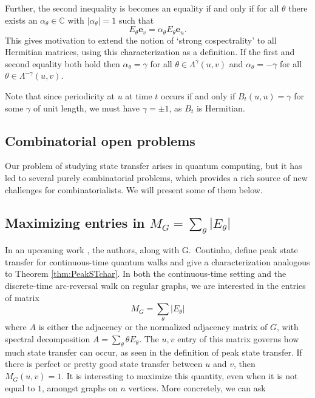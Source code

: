\documentclass{article}
\numberwithin{equation}{section}
\newcommand\cx{{\mathbb C}}%
\newcommand\Ze{{\mathbf e}}
\begin{document}
Further, the second inequality is becomes an equality if and only if for all $\theta$ there exists an $\alpha_\theta \in \cx$ with $|\alpha_\theta| = 1$ such that
\[
E_\theta\Ze_v = \alpha_\theta E_\theta\Ze_u.
\]
This gives motivation to extend the notion of `strong cospectrality' to all Hermitian matrices, using this characterization as a definition. If the first and second equality both hold then $\alpha_\theta = \gamma$ for all $\theta \in \Lambda^\gamma(u,v)$ and $\alpha_\theta = -\gamma$ for all $\theta \in \Lambda^{-\gamma}(u,v)$.


Note that since periodicity at $u$ at time $t$ occurs if and only if $B_t(u,u) = \gamma$ for some $\gamma$ of unit length, we must have $\gamma = \pm 1$, as $B_t$ is Hermitian.

\subsection{Combinatorial open problems}


Our problem of studying state transfer arises in quantum computing, but it has led to several purely  combinatorial problems, which provides a rich source of new challenges for combinatorialists. We will present some of them below. 

\subsection*{Maximizing entries in \texorpdfstring{$ M_G = \sum_{\theta} |E_{\theta}| $}{M}}


In an upcoming work \cite{CouGuoSch2025}, the authors, along with G.~Coutinho, define peak state transfer for continuous-time quantum walks and give a characterization analogous to Theorem \ref{thm:PeakSTchar}. In both the continuous-time setting and the discrete-time arc-reversal walk on regular graphs, we are interested in the entries of matrix 
 \[ M_G = \sum_{\theta} |E_{\theta}| \]
 where $A$ is either the adjacency or the normalized adjacency matrix of $G$, with spectral decomposition $A =  \sum_{\theta} \theta E_{\theta}$. The $u,v$ entry of this matrix governs how much state transfer can occur, as seen in the definition of peak state transfer. If there is perfect or pretty good state transfer between $u$ and $v$, then $M_G(u,v) = 1$. It is interesting to maximize this quantity, even when it is not equal to $1$, amongst graphs on $n$ vertices. More concretely, we can ask
 
\end{document}
